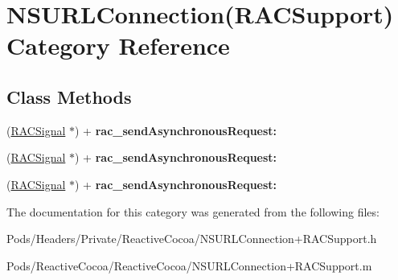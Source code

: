 \hypertarget{category_n_s_u_r_l_connection_07_r_a_c_support_08}{}\section{N\+S\+U\+R\+L\+Connection(R\+A\+C\+Support) Category Reference}
\label{category_n_s_u_r_l_connection_07_r_a_c_support_08}
\subsection*{Class Methods}
\begin{DoxyCompactItemize}
\item 
\mbox{\label{category_n_s_u_r_l_connection_07_r_a_c_support_08_a0cf9779b8d56da25e806f948d9824366}} 
(\mbox{\hyperlink{interface_r_a_c_signal}{R\+A\+C\+Signal}} $\ast$) + {\bfseries rac\+\_\+send\+Asynchronous\+Request\+:}
\item 
\mbox{\label{category_n_s_u_r_l_connection_07_r_a_c_support_08_a0cf9779b8d56da25e806f948d9824366}} 
(\mbox{\hyperlink{interface_r_a_c_signal}{R\+A\+C\+Signal}} $\ast$) + {\bfseries rac\+\_\+send\+Asynchronous\+Request\+:}
\item 
\mbox{\label{category_n_s_u_r_l_connection_07_r_a_c_support_08_a0cf9779b8d56da25e806f948d9824366}} 
(\mbox{\hyperlink{interface_r_a_c_signal}{R\+A\+C\+Signal}} $\ast$) + {\bfseries rac\+\_\+send\+Asynchronous\+Request\+:}
\end{DoxyCompactItemize}


The documentation for this category was generated from the following files\+:\begin{DoxyCompactItemize}
\item 
Pods/\+Headers/\+Private/\+Reactive\+Cocoa/N\+S\+U\+R\+L\+Connection+\+R\+A\+C\+Support.\+h\item 
Pods/\+Reactive\+Cocoa/\+Reactive\+Cocoa/N\+S\+U\+R\+L\+Connection+\+R\+A\+C\+Support.\+m\end{DoxyCompactItemize}
